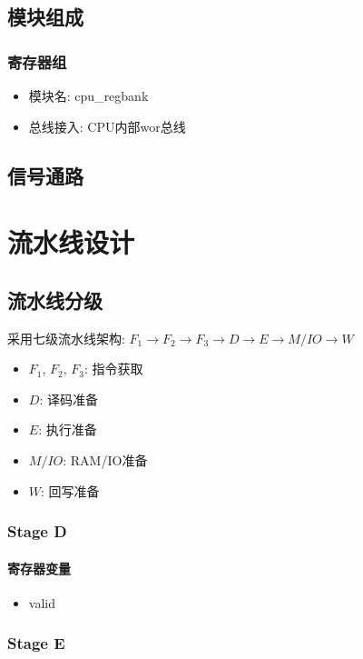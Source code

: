 \documentclass[10pt]{book}
\begin{document}
\section{模块组成}
\subsection{寄存器组}
\begin{itemize}
  \item 模块名: cpu\_regbank
  \item 总线接入: CPU内部wor总线
\end{itemize}

\section{信号通路}

\chapter{流水线设计}
\section{流水线分级}
采用七级流水线架构:
$F_{1}\rightarrow F_{2}\rightarrow F_{3}\rightarrow D\rightarrow E\rightarrow M/IO\rightarrow W$
\begin{itemize}
  \item $F_{1}$, $F_{2}$, $F_{3}$: 指令获取
  \item $D$: 译码准备
  \item $E$: 执行准备
  \item $M/IO$: RAM/IO准备
  \item $W$: 回写准备
\end{itemize}

\subsection{Stage D}
\subsubsection{寄存器变量}
\begin{itemize}
  \item valid
\end{itemize}

\subsection{Stage E}
\end{document}
